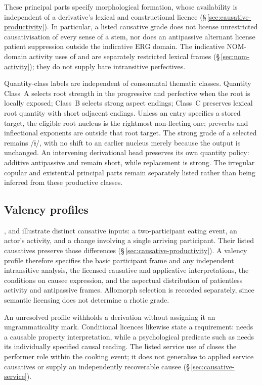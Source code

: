 These principal parts specify morphological formation, whose availability
is independent of a derivative's lexical and constructional licence
(§\,\ref{sec:causative-productivity}). In particular, a listed causative
grade does not license unrestricted causativisation of every sense of a
stem, nor does an antipassive alternant license patient suppression outside
the indicative ERG domain. The indicative NOM-domain activity uses of
 and  are separately restricted lexical frames
(§\,\ref{sec:nom-activity}); they do not supply bare intransitive
perfectives.

Quantity-class labels are independent of consonantal thematic classes.
Quantity Class~A selects root strength in the progressive and perfective
when the root is locally exposed;
Class~B selects strong aspect endings; Class~C preserves lexical root
quantity with short adjacent endings. Unless an entry specifies a stored
target, the eligible root nucleus is the rightmost non-fleeting one;
preverbs and inflectional exponents are outside that root target.
The strong grade of a selected  remains /ɨ/, with no shift to an
earlier nucleus merely because the output is unchanged.
An intervening derivational head preserves its own quantity policy: additive
antipassive  and  remain short, while replacement
 is strong. The irregular copular and existential principal parts remain separately
listed rather than being inferred from these productive classes.

\subsection{Valency profiles}\label{sec:lexical-valency-profiles}

,  and  illustrate distinct causative
inputs: a two-participant eating event, an actor's activity, and a change
involving a single arriving participant. Their listed causatives preserve
those differences (§\,\ref{sec:causative-productivity}). A valency profile
therefore specifies the basic participant frame and any independent
intransitive analysis, the licensed causative and applicative interpretations,
the conditions on causee expression, and the aspectual distribution of
patientless activity and antipassive frames. Allomorph selection is recorded
separately, since semantic licensing does not determine a rhotic grade.

An unresolved profile withholds a derivation without assigning it an
ungrammaticality mark. Conditional licences likewise state a requirement:
 needs a causable property interpretation, while a psychological
predicate such as  needs its individually specified causal
reading. The listed service use of  closes the performer role
within the cooking event; it does not generalise to applied service
causatives or supply an independently recoverable causee
(§\,\ref{sec:causative-service}).

